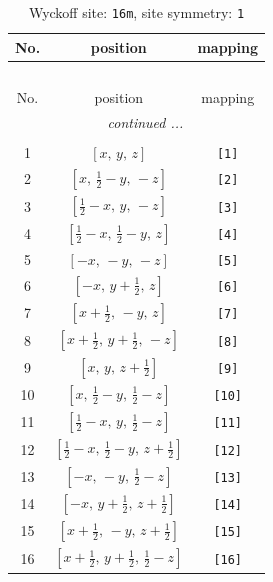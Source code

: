 \documentclass[fleqn,8pt]{jsarticle}
\begin{document}
\begin{longtable}{ccc}
\caption{Wyckoff site: {\tt 16m}, site symmetry: {\tt 1}}
 \\
 \hline \hline
No. & position & mapping \\ \hline \endfirsthead

\multicolumn{2}{l}{\tablename\ \thetable{}} \\
 \hline \hline
No. & position & mapping \\ \hline \endhead

 \hline \hline
\multicolumn{2}{r}{\footnotesize\it continued ...} \\ \endfoot

 \hline \hline
\multicolumn{2}{r}{} \\ \endlastfoot

1 & $\left[ x,\, y,\, z \right]$ & {\tt [1]} \\ \hline
2 & $\left[ x,\, \frac{1}{2} - y,\, - z \right]$ & {\tt [2]} \\ \hline
3 & $\left[ \frac{1}{2} - x,\, y,\, - z \right]$ & {\tt [3]} \\ \hline
4 & $\left[ \frac{1}{2} - x,\, \frac{1}{2} - y,\, z \right]$ & {\tt [4]} \\ \hline
5 & $\left[ - x,\, - y,\, - z \right]$ & {\tt [5]} \\ \hline
6 & $\left[ - x,\, y + \frac{1}{2},\, z \right]$ & {\tt [6]} \\ \hline
7 & $\left[ x + \frac{1}{2},\, - y,\, z \right]$ & {\tt [7]} \\ \hline
8 & $\left[ x + \frac{1}{2},\, y + \frac{1}{2},\, - z \right]$ & {\tt [8]} \\ \hline
9 & $\left[ x,\, y,\, z + \frac{1}{2} \right]$ & {\tt [9]} \\ \hline
10 & $\left[ x,\, \frac{1}{2} - y,\, \frac{1}{2} - z \right]$ & {\tt [10]} \\ \hline
11 & $\left[ \frac{1}{2} - x,\, y,\, \frac{1}{2} - z \right]$ & {\tt [11]} \\ \hline
12 & $\left[ \frac{1}{2} - x,\, \frac{1}{2} - y,\, z + \frac{1}{2} \right]$ & {\tt [12]} \\ \hline
13 & $\left[ - x,\, - y,\, \frac{1}{2} - z \right]$ & {\tt [13]} \\ \hline
14 & $\left[ - x,\, y + \frac{1}{2},\, z + \frac{1}{2} \right]$ & {\tt [14]} \\ \hline
15 & $\left[ x + \frac{1}{2},\, - y,\, z + \frac{1}{2} \right]$ & {\tt [15]} \\ \hline
16 & $\left[ x + \frac{1}{2},\, y + \frac{1}{2},\, \frac{1}{2} - z \right]$ & {\tt [16]} \\
\end{longtable}
\end{document}
